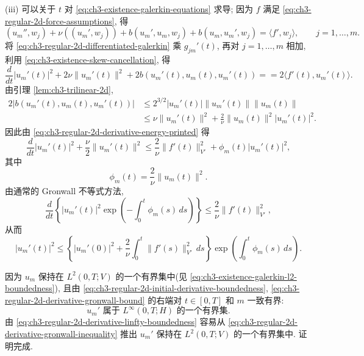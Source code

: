 \begin{Proof}
(iii) 可以关于 $t$ 对 \eqref{eq:ch3-existence-galerkin-equations} 求导; 因为 $f$ 满足 \eqref{eq:ch3-regular-2d-force-assumptions}, 得
\begin{equation}
(u_m'',w_j)+\nu((u_m',w_j))+b(u_m',u_m,w_j)
+b(u_m,u_m',w_j)=\langle f',w_j\rangle,
\qquad j=1,\ldots,m.
\label{eq:ch3-regular-2d-differentiated-galerkin}
\end{equation}
将 \eqref{eq:ch3-regular-2d-differentiated-galerkin} 乘 $g_{jm}'(t)$, 再对 $j=1,\ldots,m$ 相加, 利用 \eqref{eq:ch3-existence-skew-cancellation}, 得
\begin{equation}
\frac d{dt}|u_m'(t)|^2+2\nu\lVert u_m'(t)\rVert^2
+2b(u_m'(t),u_m(t),u_m'(t))
==2\langle f'(t),u_m'(t)\rangle.
\label{eq:ch3-regular-2d-derivative-energy-printed}
\end{equation}
由引理 \ref{lem:ch3-trilinear-2d},
\[
\begin{aligned}
2|b(u_m'(t),u_m(t),u_m'(t))|
&\leq2^{3/2}|u_m'(t)|\lVert u_m'(t)\rVert\lVert u_m(t)\rVert\\
&\leq\nu\lVert u_m'(t)\rVert^2
+\frac2\nu\lVert u_m(t)\rVert^2|u_m'(t)|^2.
\end{aligned}
\]
因此由 \eqref{eq:ch3-regular-2d-derivative-energy-printed} 得
\begin{equation}
\frac d{dt}|u_m'(t)|^2+\frac\nu2\lVert u_m'(t)\rVert^2
\leq\frac2\nu\lVert f'(t)\rVert_{V'}^2
+\phi_m(t)|u_m'(t)|^2,
\label{eq:ch3-regular-2d-derivative-gronwall-inequality}
\end{equation}
其中
\[
\phi_m(t)=\frac2\nu\lVert u_m(t)\rVert^2.
\]
由通常的 Gronwall 不等式方法,
\[
\frac d{dt}\left\{|u_m'(t)|^2
\exp\left(-\int_0^t\phi_m(s)\,ds\right)\right\}
\leq\frac2\nu\lVert f'(t)\rVert_{V'}^2,
\]
从而
\begin{equation}
|u_m'(t)|^2\leq
\left\{|u_m'(0)|^2+\frac2\nu\int_0^t\lVert f'(s)\rVert_{V'}^2\,ds\right\}
\exp\left(\int_0^t\phi_m(s)\,ds\right).
\label{eq:ch3-regular-2d-derivative-gronwall-bound}
\end{equation}

\hypertarget{chapter-03-page-219}{}
因为 $u_m$ 保持在 $L^2(0,T;V)$ 的一个有界集中(见 \eqref{eq:ch3-existence-galerkin-l2-boundedness}), 且由 \eqref{eq:ch3-regular-2d-initial-derivative-boundedness}, \eqref{eq:ch3-regular-2d-derivative-gronwall-bound} 的右端对 $t\in[0,T]$ 和 $m$ 一致有界:
\begin{equation}
u_m'\text{ 属于 }L^\infty(0,T;H)\text{ 的一个有界集}.
\label{eq:ch3-regular-2d-derivative-linfty-boundedness}
\end{equation}
由 \eqref{eq:ch3-regular-2d-derivative-linfty-boundedness} 容易从 \eqref{eq:ch3-regular-2d-derivative-gronwall-inequality} 推出 $u_m'$ 保持在 $L^2(0,T;V)$ 的一个有界集中. 证明完成.
\end{Proof}

